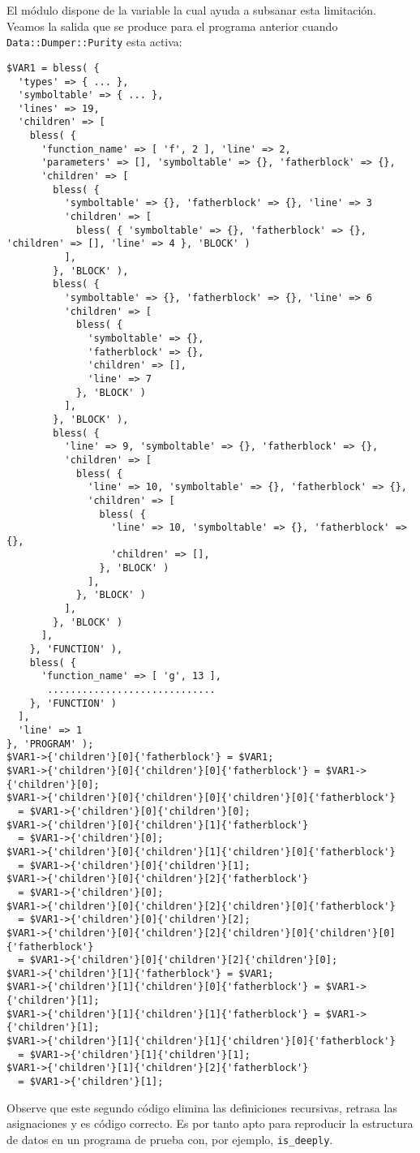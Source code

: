 El módulo  dispone de la variable
 la cual ayuda a subsanar esta
limitación. Veamos la salida que se produce para el programa
anterior cuando \verb|Data::Dumper::Purity| esta activa:
\begin{verbatim}
$VAR1 = bless( {
  'types' => { ... },
  'symboltable' => { ... },
  'lines' => 19,
  'children' => [
    bless( {
      'function_name' => [ 'f', 2 ], 'line' => 2, 
      'parameters' => [], 'symboltable' => {}, 'fatherblock' => {}, 
      'children' => [
        bless( {
          'symboltable' => {}, 'fatherblock' => {}, 'line' => 3
          'children' => [
            bless( { 'symboltable' => {}, 'fatherblock' => {}, 'children' => [], 'line' => 4 }, 'BLOCK' )
          ],
        }, 'BLOCK' ),
        bless( {
          'symboltable' => {}, 'fatherblock' => {}, 'line' => 6
          'children' => [
            bless( {
              'symboltable' => {},
              'fatherblock' => {},
              'children' => [],
              'line' => 7
            }, 'BLOCK' )
          ],
        }, 'BLOCK' ),
        bless( {
          'line' => 9, 'symboltable' => {}, 'fatherblock' => {},
          'children' => [
            bless( {
              'line' => 10, 'symboltable' => {}, 'fatherblock' => {},
              'children' => [
                bless( {
                  'line' => 10, 'symboltable' => {}, 'fatherblock' => {},
                  'children' => [],
                }, 'BLOCK' )
              ],
            }, 'BLOCK' )
          ],
        }, 'BLOCK' )
      ],
    }, 'FUNCTION' ),
    bless( {
      'function_name' => [ 'g', 13 ],
       .............................
    }, 'FUNCTION' )
  ],
  'line' => 1
}, 'PROGRAM' );
$VAR1->{'children'}[0]{'fatherblock'} = $VAR1;
$VAR1->{'children'}[0]{'children'}[0]{'fatherblock'} = $VAR1->{'children'}[0];
$VAR1->{'children'}[0]{'children'}[0]{'children'}[0]{'fatherblock'} 
  = $VAR1->{'children'}[0]{'children'}[0];
$VAR1->{'children'}[0]{'children'}[1]{'fatherblock'} 
  = $VAR1->{'children'}[0];
$VAR1->{'children'}[0]{'children'}[1]{'children'}[0]{'fatherblock'} 
  = $VAR1->{'children'}[0]{'children'}[1];
$VAR1->{'children'}[0]{'children'}[2]{'fatherblock'} 
  = $VAR1->{'children'}[0];
$VAR1->{'children'}[0]{'children'}[2]{'children'}[0]{'fatherblock'} 
  = $VAR1->{'children'}[0]{'children'}[2];
$VAR1->{'children'}[0]{'children'}[2]{'children'}[0]{'children'}[0]{'fatherblock'} 
  = $VAR1->{'children'}[0]{'children'}[2]{'children'}[0];
$VAR1->{'children'}[1]{'fatherblock'} = $VAR1;
$VAR1->{'children'}[1]{'children'}[0]{'fatherblock'} = $VAR1->{'children'}[1];
$VAR1->{'children'}[1]{'children'}[1]{'fatherblock'} = $VAR1->{'children'}[1];
$VAR1->{'children'}[1]{'children'}[1]{'children'}[0]{'fatherblock'} 
  = $VAR1->{'children'}[1]{'children'}[1];
$VAR1->{'children'}[1]{'children'}[2]{'fatherblock'} 
  = $VAR1->{'children'}[1];
\end{verbatim}
Observe que este segundo código elimina las definiciones recursivas,
retrasa las asignaciones y es código correcto.
Es por tanto apto para reproducir la estructura
de datos en un programa de prueba con, por ejemplo, \verb|is_deeply|.

